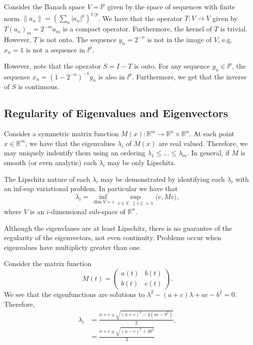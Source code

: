 \begin{example}
	Consider the Banach space \(V = l^p\) given by the space of sequences with finite norm \(\|a_n\| = \left(\sum_n |a_n|^p\right)^{1/p}\). We have that the operator \(T: V \to V\) given by \(T(a_n)_m = 2^{-m} a_m\) is a compact operator. Furthermore, the kernel of \(T\) is trivial. However, \(T\) is not onto. The sequence \(y_n = 2^{-n}\) is not in the image of \(V\), e.g. \(x_n = 1\) is not a sequence in \(l^p\).

	However, note that the operator \(S = I - T\) is onto. For any sequence \(y_n \in l^p\), the sequence \(x_n = \left(1 - 2^{-n}\right)^{-1} y_n\) is also in \(l^p\). Furthermore, we get that the inverse of \(S\) is continuous.
\end{example}
\subsection{Regularity of Eigenvalues and Eigenvectors}\label{sub:eigen}

Consider a symmetric matrix function $M(x): \mathbb R^m \to \mathbb R^n\times \mathbb R^n$. At each point $x\in \mathbb R^m$, we have that the eigenvalues $\lambda_i$ of $M(x)$ are real valued. Therefore, we may uniquely indentify them using an ordering $\lambda_1 \leq ... \leq \lambda_m$. In general, if $M$ is smooth (or even analytic) each $\lambda_i$ may be only Lipschitz.

The Lipschitz nature of each $\lambda_i$ may be demonstrated by identifying each $\lambda_i$ with an inf-sup variational problem. In particular we have that
\begin{equation}
\lambda_i = \inf\limits_{\dim V = i} \sup\limits_{v\in V, \, \|v\| = 1} \langle v, Mv\rangle,
\end{equation}
where $V$ is an $i$-dimensional sub-space of $\mathbb R^n$.

Although the eigenvlaues are at least Lipschitz, there is no guarantee of the regularity of the eigenvectors, not even continuity. Problems occur when eigenvalues have multiplicty greater than one.

Consider the matrix function
\begin{equation}
M(t) = \begin{pmatrix}
a(t) & b(t)\\
b(t) & c(t)
\end{pmatrix}.
\end{equation}
We see that the eigenfunctions are solutions to $\lambda^2 - (a + c)\lambda + ac-b^2 = 0$. Therefore,
\begin{align}
\lambda_i & = \frac{a+c \pm \sqrt{(a+c)^2 - 4(ac - b^2)}}{2},\\
& = \frac{a+c \pm \sqrt{(a-c)^2 + 4 b^2}}{2}
\end{align}

